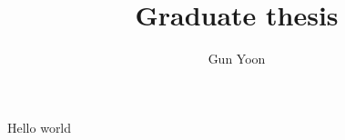 \documentclass{article}
\title{Graduate thesis}
\author{Gun Yoon}
\begin{document}
\maketitle
\newpage

Hello world
\end{document}
